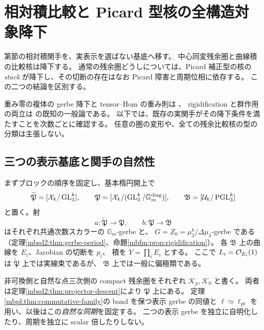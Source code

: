 \section{相対積比較と Picard 型核の全構造対象降下}
\label{mbic:sec:intrinsic-comparison}

第節の相対積関手を、実表示を選ばない基底へ移す。
中心同変残余圏と曲線積の比較核は降下する。
通常の残余圏どうしについては、Picard 補正型の核の
\emph{stack} が降下し、その切断の存在はなお Picard 障害と周期位相に依存する。
この二つの結論を区別する。

重み零の複体の gerbe 降下と tensor--Hom の重み則は
\cite[Propositions~4.10, 5.7; Corollaries~4.12, 5.9]{NFMBerghSchnurer}、
rigidification と群作用の両立は
\cite[Theorem~5.1]{MBFMRomagny}の既知の一般論である。
以下では、既存の実関手がその降下条件を満たすことを次数ごとに確認する。
任意の圏の変形や、全ての残余比較核の型の分類は主張しない。

\subsection{三つの表示基底と関手の自然性}

まずブロックの順序を固定し、基本楕円開上で
\[
 \widetilde{\mathfrak P}
   =[\mathcal X_k/\operatorname{GL}_3^k],\qquad
 \mathfrak P=[\mathcal X_k/(\operatorname{GL}_3^k/\mathbb G_m^{\mathrm{diag}})],
 \qquad
 \mathfrak B=[\mathcal U_k/\operatorname{PGL}_3^k]
\]
と置く。射
\[
 a:\widetilde{\mathfrak P}\longrightarrow\mathfrak P,\qquad
 b:\mathfrak P\longrightarrow\mathfrak B
\]
はそれぞれ共通次数スカラーの $\mathbb G_m$-gerbe と、
$G=Z_0=\mu_3^k/\Delta\mu_3$-gerbe である
（定理\ref{mbsd2:thm:gerbe-period}、命題\ref{mbfm:prop:rigidification}）。
各 $\mathfrak B$ 上の曲線を $E_i$、Jacobian の切断を $p_i$、
積を $Y=\prod_iE_i$ とする。
ここで $L_i=\mathcal O_{E_i}(1)$ は $\widetilde{\mathfrak P}$ 上では実線束であるが、
$\mathfrak B$ 上では一般に偏極類である。

非可換側と自然な点三次側の compact 残余圏をそれぞれ
$\mathscr K_p,\mathscr K_0$ と書く。
両者は定理\ref{mbsd2:thm:projector-descent}により $\mathfrak P$ 上にある。
定理\ref{mbpl:thm:commutative-family}の band を保つ表示 gerbe の同値と
$\ell\simeq\ell_{\mathrm{pt}}$ を用い、以後はこの\emph{自然な同期}を固定する。
二つの表示 gerbe を独立に自明化したり、周期を独立に scalar 倍したりしない。

